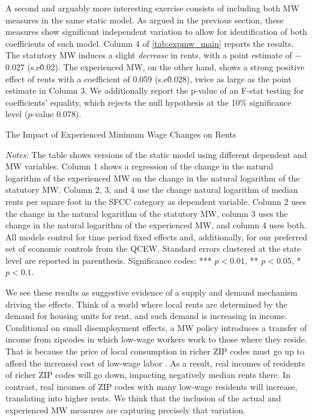 A second and arguably more interesting exercise consists of including both MW measures in
the same static model. As argued in the previous section, these measures show significant
independent variation to allow for identification of both coefficients of such model. 
Column 4 of \autoref{tab:expmw_main} reports the results. The statutory MW induces
a slight \textit{decrease} in rents, with a point estimate of $-$0.027 (s.e\. 0.02). The 
experienced MW, on the other hand, shows a strong positive effect of rents with a 
coefficient of 0.059 (s.e\. 0.028), twice as large as the point estimate in Column 3. We
additionally report the p-value of an F-stat testing for coefficients' equality, which rejects the
null hypothesis at the 10\% significance level ($p$-value 0.078). 

\begin{table}[htb!]\centering
	\caption{The Impact of Experienced Minimum Wage Changes on Rents}
	\label{tab:expmw_main}
	
	\begin{minipage}{0.95\textwidth}\footnotesize
		\vspace{3mm}	
		\textit{Notes:} The table shows versions of the static model using different 
		dependent and MW variables. Column 1 shows a regression of the change in the natural 
		logarithm of the experienced MW on the change in the natural logarithm of the 
		statutory MW. Column 2, 3, and 4 use the change natural logarithm of median rents per 
		square foot in the SFCC category as dependent variable. Column 2 uses the change in 
		the natural logarithm of the statutory MW, column 3 uses the change in the natural 
		logarithm of the experienced MW, and column 4 uses both. All models control for time 
		period fixed effects and, additionally, for our preferred set of economic controls 
		from the QCEW. 
		Standard errors clustered at the state level are reported in parenthesis. Significance 
		codes: *** $p < 0.01$, ** $p < 0.05$, * $p < 0.1$.
	\end{minipage}
\end{table}

We see these results as suggestive evidence of a supply and demand mechanism driving the 
effects. Think of a world where local rents are determined by the demand for housing units for
rent, and such demand is increasing in income. Conditional on small disemployment effects, a MW
policy introduces a transfer of income from zipcodes in which low-wage workers work to those 
where they reside. That is because the price of local consumption in richer ZIP codes must go 
up to afford the increased cost of low-wage labor \parencite[as exemplified by, e.g.,][]
{Allegretto2018}. As a result, real incomes of residents of richer ZIP codes will go down, 
impacting negatively median rents there. In contrast, real incomes of ZIP codes with many 
low-wage residents will increase, translating into higher rents. We think that the inclusion 
of the actual and experienced MW measures are capturing precisely that variation.
